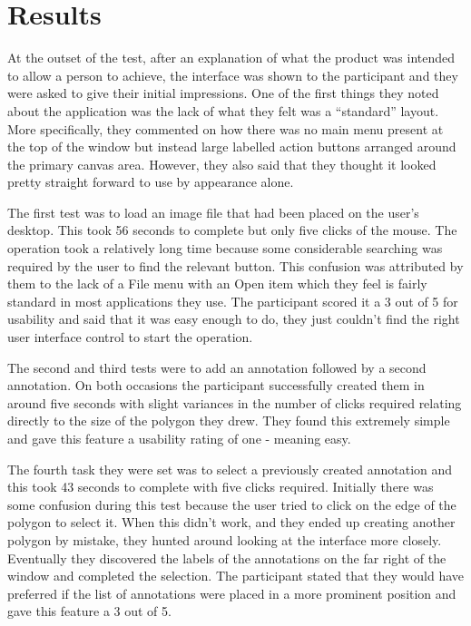 \section{Results}

At the outset of the test, after an explanation of what the product was intended to allow a person to achieve, the interface was shown to the participant and they were asked to give their initial impressions.  One of the first things they noted about the application was the lack of what they felt was a “standard” layout.  More specifically, they commented on how there was no main menu present at the top of the window but instead large labelled action buttons arranged around the primary canvas area.  However, they also said that they thought it looked pretty straight forward to use by appearance alone.

The first test was to load an image file that had been placed on the user’s desktop.  This took 56 seconds to complete but only five clicks of the mouse.  The operation took a relatively long time because some considerable searching was required by the user to find the relevant button.  This confusion was attributed by them to the lack of a File menu with an Open item which they feel is fairly standard in most applications they use.  The participant scored it a 3 out of 5 for usability and said that it was easy enough to do, they just couldn’t find the right user interface control to start the operation.

The second and third tests were to add an annotation followed by a second annotation.  On both occasions the participant successfully created them in around five seconds with slight variances in the number of clicks required relating directly to the size of the polygon they drew.  They found this extremely simple and gave this feature a usability rating of one - meaning easy.

The fourth task they were set was to select a previously created annotation and this took 43 seconds to complete with five clicks required.  Initially there was some confusion during this test because the user tried to click on the edge of the polygon to select it.  When this didn’t work, and they ended up creating another polygon by mistake, they hunted around looking at the interface more closely.  Eventually they discovered the labels of the annotations on the far right of the window and completed the selection.  The participant stated that they would have preferred if the list of annotations were placed in a more prominent position and gave this feature a 3 out of 5.

